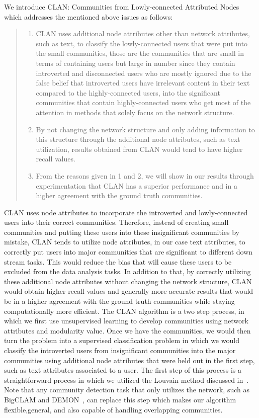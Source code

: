 We introduce CLAN: Communities from Lowly-connected Attributed Nodes which addresses the mentioned above issues as follows:
\begin{quote}
\begin{enumerate}
\item CLAN uses additional node attributes other than network attributes, such as text, to classify the lowly-connected users that were put into the small communities, those are the communities that are small in terms of containing users but large in number since they contain introverted and disconnected users who are mostly ignored due to the false belief that introverted users have irrelevant content in their text compared to the highly-connected users, into the significant communities that contain highly-connected users who get most of the attention in methods that solely focus on the network structure. %
\item By not changing the network structure and only adding information to this structure through the additional node attributes, such as text utilization, results obtained from CLAN would tend to have higher recall values.
\item From the reasons given in 1 and 2, we will show in our results through experimentation that CLAN has a superior performance and in a higher agreement with the ground truth communities.
\end{enumerate}
\end{quote}
CLAN uses node attributes to incorporate the introverted and lowly-connected users into their correct communities. Therefore, instead of creating small communities and putting these users into these insignificant communities by mistake, CLAN tends to utilize node attributes, in our case text attributes, to correctly put users into major communities that are significant to different down stream tasks. This would reduce the bias that will cause these users to be excluded from the data analysis tasks. In addition to that, by correctly utilizing these additional node attributes without changing the network structure, CLAN would obtain higher recall values and generally more accurate results that would be in a higher agreement with the ground truth communities while staying computationally more efficient.
The CLAN algorithm is a two step process, in which we first use unsupervised learning to develop communities using network attributes and modularity value. Once we have the communities, we would then turn the problem into a supervised classification problem in which we would classify the introverted users from insignificant communities into the major communities using additional node attributes that were held out in the first step, such as text attributes associated to a user. The first step of this process is a straightforward process in which we utilized the Louvain method discussed in~\cite{blondel2008fast}. Note that any community detection task that only utilizes the network, such as BigCLAM and DEMON~\cite{yang2013overlapping,coscia2012demon}, can replace this step which makes our algorithm flexible,general, and also capable of handling overlapping communities. 
